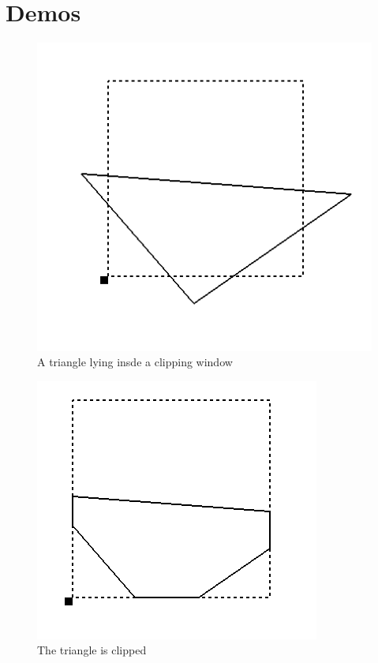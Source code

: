 \documentclass{article}
\begin{document}
\section{Demos}
\label{sec:orgheadline11}
\begin{figure}[htb]
\centering
\includegraphics[width=.9\linewidth]{./img/unclipped.png}
\caption{A triangle lying insde a clipping window}
\end{figure}
\begin{figure}[htb]
\centering
\includegraphics[width=.9\linewidth]{./img/clipped.png}
\caption{The triangle is clipped}
\end{figure}
\end{document}
